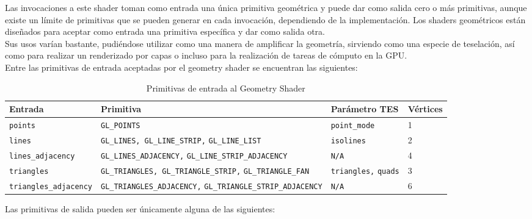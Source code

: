 Las invocaciones a este shader toman como entrada una única primitiva geométrica
y puede dar como salida cero o más primitivas, aunque existe un límite de
primitivas que se pueden generar en cada invocación, dependiendo de la
implementación. Los shaders geométricos están diseñados para aceptar como
entrada una primitiva específica y dar como salida otra. \\

Sus usos varían bastante, pudiéndose utilizar como una manera de amplificar la
geometría, sirviendo como una especie de teselación, así como para realizar un
renderizado por capas o incluso para la realización de tareas de cómputo en la
GPU. \\

Entre las primitivas de entrada aceptadas por el geometry shader se encuentran
las siguientes:

\begin{table}[h]
		\begin{tabular}{|m{4cm}|m{7cm}|m{2.2cm}|m{1.5cm}|}

			\hline
			Entrada & Primitiva & Parámetro TES & Vértices\\
			\hline

			\verb|points| & \verb|GL_POINTS| & \verb|point_mode| & 1 \\
			\hline

			\verb|lines| & \verb|GL_LINES, GL_LINE_STRIP,| \verb|GL_LINE_LIST| &
			\verb|isolines| & 2\\

			\hline

			\verb|lines_adjacency| & \verb|GL_LINES_ADJACENCY,|
			\verb|GL_LINE_STRIP_ADJACENCY| & \verb|N/A| & 4\\

			\hline

			\verb|triangles| & \verb|GL_TRIANGLES, GL_TRIANGLE_STRIP,|
			\verb|GL_TRIANGLE_FAN| & \verb|triangles,| \verb|quads| & 3 \\

			\hline

			\verb|triangles_adjacency| & \verb|GL_TRIANGLES_ADJACENCY,|
			\verb|GL_TRIANGLE_STRIP_ADJACENCY| & \verb|N/A| & 6 \\

			\hline
		\end{tabular}
		\caption{Primitivas de entrada al Geometry Shader}
		\label{tabla3.1}
\end{table}

Las primitivas de salida pueden ser únicamente alguna de las siguientes:

